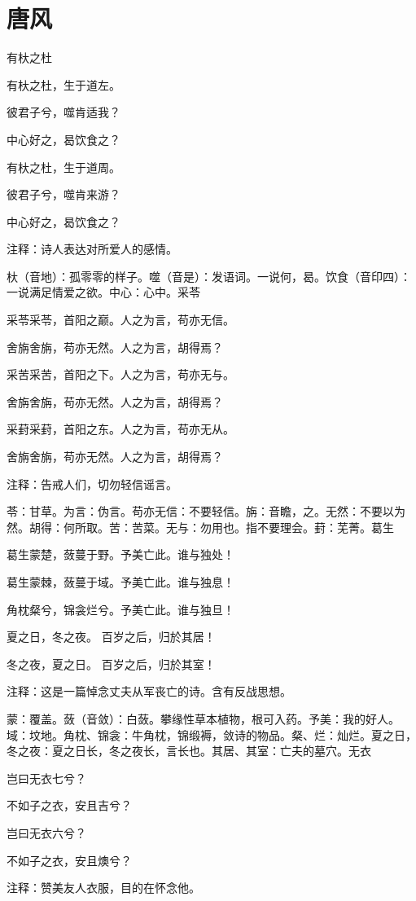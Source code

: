 \documentclass[12pt,UTF8]{ctexbook}
\begin{document}
\part{唐风}

有杕之杜

有杕之杜，生于道左。

彼君子兮，噬肯适我？

中心好之，曷饮食之？

有杕之杜，生于道周。

彼君子兮，噬肯来游？

中心好之，曷饮食之？

注释：诗人表达对所爱人的感情。

杕（音地）：孤零零的样子。噬（音是）：发语词。一说何，曷。饮食（音印四）：一说满足情爱之欲。中心：心中。采苓

采苓采苓，首阳之巅。人之为言，苟亦无信。

舍旃舍旃，苟亦无然。人之为言，胡得焉？

采苦采苦，首阳之下。人之为言，苟亦无与。

舍旃舍旃，苟亦无然。人之为言，胡得焉？

采葑采葑，首阳之东。人之为言，苟亦无从。

舍旃舍旃，苟亦无然。人之为言，胡得焉？

注释：告戒人们，切勿轻信谣言。

苓：甘草。为言：伪言。苟亦无信：不要轻信。旃：音瞻，之。无然：不要以为然。胡得：何所取。苦：苦菜。无与：勿用也。指不要理会。葑：芜菁。葛生

葛生蒙楚，蔹蔓于野。予美亡此。谁与独处！

葛生蒙棘，蔹蔓于域。予美亡此。谁与独息！

角枕粲兮，锦衾烂兮。予美亡此。谁与独旦！

夏之日，冬之夜。 百岁之后，归於其居！

冬之夜，夏之日。 百岁之后，归於其室！

注释：这是一篇悼念丈夫从军丧亡的诗。含有反战思想。

蒙：覆盖。蔹（音敛）：白蔹。攀缘性草本植物，根可入药。予美：我的好人。域：坟地。角枕、锦衾：牛角枕，锦缎褥，敛诗的物品。粲、烂：灿烂。夏之日，冬之夜：夏之日长，冬之夜长，言长也。其居、其室：亡夫的墓穴。无衣

岂曰无衣七兮？

不如子之衣，安且吉兮？

岂曰无衣六兮？

不如子之衣，安且燠兮？

注释：赞美友人衣服，目的在怀念他。
\end{document}
